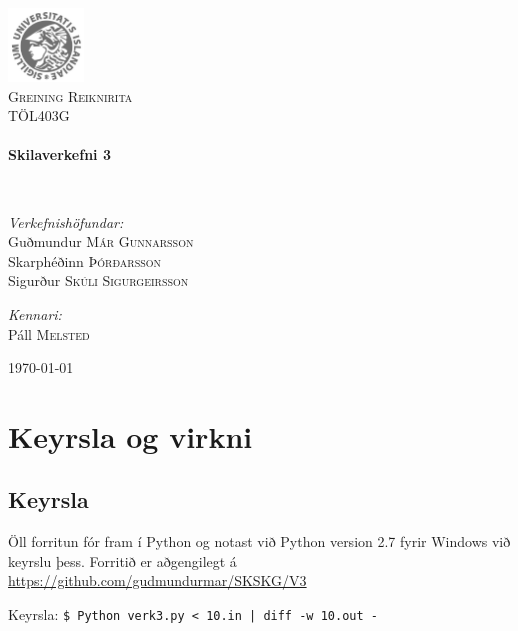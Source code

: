 \documentclass{article}
\begin{document}
\begin {titlepage}
\begin{center}
\includegraphics[width=0.15\textwidth]{./Haskoli_Islands_rett.jpg}~\\[1cm]

\textsc{\LARGE Greining Reiknirita}\\[1.5cm]

\textsc{\Large TÖL403G}\\[0.5cm]

\HRule \\[0.4cm]
{ \huge \bfseries Skilaverkefni 3\\[0.4cm] }

\HRule \\[1.5cm]

\begin{minipage}{0.5\textwidth}
\begin{flushleft} \large
\emph{Verkefnishöfundar:}
\\ Guðmundur\textsc{ Már Gunnarsson }
\\ Skarphéðinn \textsc{Þórðarsson}
\\ Sigurður \textsc{Skúli Sigurgeirsson}

\end{flushleft}
\end{minipage}
\begin{minipage}{0.4\textwidth}
\begin{flushright} \large
\emph{Kennari:} \\
Páll \textsc{Melsted}
\end{flushright}
\end{minipage}

\vfill

{\large \today}

\end{center}

\end{titlepage}

\section {Keyrsla og virkni}
\subsection {Keyrsla}
Öll forritun fór fram í Python og notast við Python version 2.7 fyrir Windows við keyrslu þess. 
Forritið er aðgengilegt á \url{https://github.com/gudmundurmar/SKSKG/V3}
 \begin {center}Keyrsla: \texttt {\$ Python verk3.py < 10.in | diff -w 10.out -} \end {center}
\end{document}
